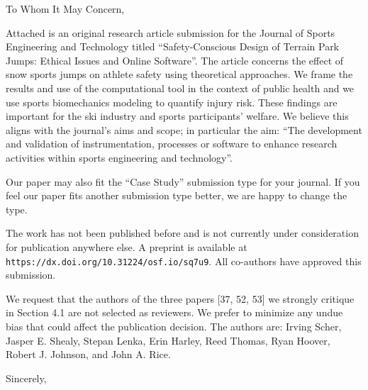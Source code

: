 \documentclass[en]{tuletter}
\date{November 2, 2021}
\begin{document}
\makeheader
\opening{To Whom It May Concern,}

Attached is an original research article submission for the Journal of Sports
Engineering and Technology titled ``Safety-Conscious Design of Terrain Park
Jumps: Ethical Issues and Online Software''. The article concerns the effect of
snow sports jumps on athlete safety using theoretical approaches. We frame the
results and use of the computational tool in the context of public health and
we use sports biomechanics modeling to quantify injury risk. These findings are
important for the ski industry and sports participants' welfare. We believe
this aligns with the journal's aims and scope; in particular the aim: ``The
development and validation of instrumentation, processes or software to enhance
research activities within sports engineering and technology''.

Our paper may also fit the ``Case Study'' submission type for your journal. If
you feel our paper fits another submission type better, we are happy to change
the type.

The work has not been published before and is not currently under consideration
for publication anywhere else. A preprint is available at
\verb|https://dx.doi.org/10.31224/osf.io/sq7u9|. All co-authors have approved
this submission.

We request that the authors of the three papers [37, 52, 53] we strongly
critique in Section 4.1 are not selected as reviewers. We prefer to minimize
any undue bias that could affect the publication decision. The authors are:
Irving Scher, Jasper E. Shealy, Stepan Lenka, Erin Harley, Reed Thomas, Ryan
Hoover, Robert J. Johnson, and John A. Rice.

\closing{Sincerely,}
\end{document}
